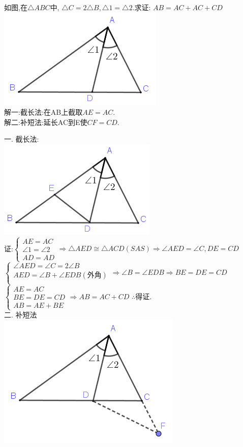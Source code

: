\documentclass[cn,blue,12pt]{elegantbook}
\begin{document}
\begin{liti}
\item 如图,在\(\triangle ABC\)中, \(\triangle C = 2\triangle B, \triangle 1 = \triangle 2\).求证: \(AB=AC + AC+CD\)\\
    \includegraphics[width=0.4\linewidth]{pic/20200513001.png}\\
    解一:截长法:在AB上截取\(AE = AC\).\\
    解二:补短法:延长AC到E使\(CF=CD\).
\begin{solution}
        一. 截长法:\\
        \includegraphics[width=0.4\linewidth]{pic/20200513002.png}\\
        证:\(\begin{cases} AE=AC\\ \angle 1 = \angle 2\\ AD=AD \end{cases} \Rightarrow \triangle AED \cong \triangle ACD (SAS) \Rightarrow \angle AED = \angle C , DE=CD\)\\
        \(\begin{cases} \angle AED = \angle C= 2\angle B\\ AED = \angle B + \angle EDB (\text{外角})\\  \end{cases} \Rightarrow \angle B = \angle EDB \Rightarrow BE=DE=CD\)\\
        \(\begin{cases} AE=AC\\ BE=DE=CD\\ AB=AE+BE \end{cases}\Rightarrow AB=AC+CD\)
        \(\therefore \)得证.\\
        二. 补短法\\
        \includegraphics[width=0.4\linewidth]{pic/20200513003.png}\\

\end{solution}
\end{liti}
\end{document}
